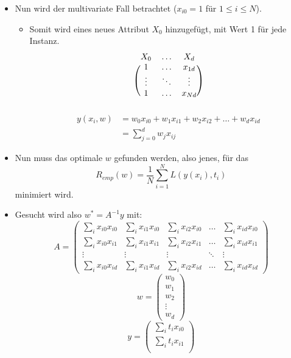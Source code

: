 \documentclass{scrartcl}
\begin{document}
\begin{itemize}
	\item Nun wird der multivariate Fall betrachtet ($ x_{i0} = 1 $ für $ 1 
	\leq i \leq N $).
	\begin{itemize}
		\item Somit wird eines neues Attribut $ X_0 $ hinzugefügt, mit Wert 1 
		für jede Instanz.
		\[
			\begin{blockarray}{ccc}
				X_0 & \ldots & X_d \\
				\begin{block}{(ccc)}
					1 & \ldots & x_{1d} \\
					\vdots & \ddots & \vdots \\
					1 & \ldots & x_{Nd} \\
				\end{block}
			\end{blockarray}
		\]
		\begin{align*}
			y(x_i, w) &= w_0x_{i0} + w_1x_{i1} + w_2x_{i2} + \ldots + w_dx_{id} 
			\\
			&= \sum_{j=0}^{d} w_jx_{ij}
		\end{align*}
	\end{itemize}
	\item Nun muss das optimale $ w $ gefunden werden, also jenes, für das
	\[ R_{emp}(w) = \frac{1}{N} \sum_{i=1}^{N} L(y(x_i), t_i) \]
	minimiert wird.
	\item Gesucht wird also $ w^* = A^{-1} y $ mit:
	\[ A = \begin{pmatrix}
		\sum_{i} x_{i0}x_{i0} & \sum_{i} x_{i1}x_{i0} & \sum_{i} 
		x_{i2}x_{i0} & \ldots & \sum_{i} x_{id}x_{i0} \\
		\sum_{i} x_{i0}x_{i1} & \sum_{i} x_{i1}x_{i1} & \sum_{i} 
		x_{i2}x_{i1} & \ldots & \sum_{i} x_{id}x_{i1} \\
		\vdots & \vdots & \vdots & \ddots & \vdots \\
		\sum_{i} x_{i0}x_{id} & \sum_{i} x_{i1}x_{id} & \sum_{i} 
		x_{i2}x_{id} & \ldots & \sum_{i} x_{id}x_{id}
	\end{pmatrix} \]
	\[ w = \begin{pmatrix}
		w_0 \\
		w_1 \\
		w_2 \\
		\vdots \\
		w_d
	\end{pmatrix} \]
	\[ y = \begin{pmatrix}
		\sum_i t_i x_{i0} \\
		\sum_i t_i x_{i1} \\

\end{pmatrix}\]
\end{itemize}
\end{document}
